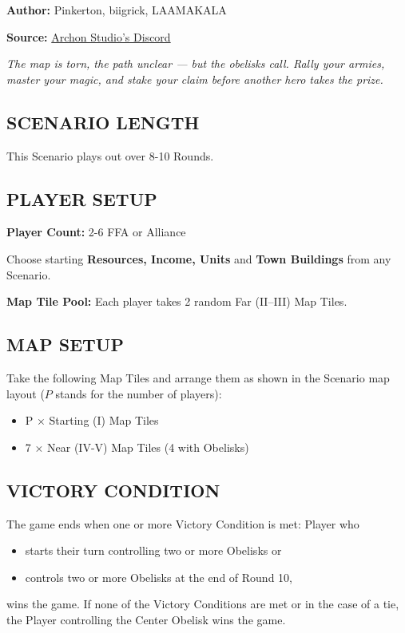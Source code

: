 
\begin{multicols*}{2}

\textbf{Author:} Pinkerton, biigrick, LAAMAKALA

\textbf{Source:} \href{<https://discord.com/channels/740870068178649108/1232319328049954826>}{Archon Studio's Discord}

\textit{The map is torn, the path unclear — but the obelisks call. Rally your armies, master your magic, and stake your claim before another hero takes the prize.}  %

\subsection*{\MakeUppercase{Scenario Length}}
This Scenario plays out over 8-10 Rounds.

\subsection*{\MakeUppercase{Player Setup}}
\textbf{Player Count:} 2-6 FFA or Alliance

Choose starting \textbf{Resources, Income, Units} and \textbf{Town Buildings} from any Scenario.

\textbf{Map Tile Pool:} Each player takes 2 random Far (II--III) Map Tiles.

\subsection*{\MakeUppercase{Map Setup}}
Take the following Map Tiles and arrange them as shown in the Scenario map layout ($P$ stands for the number of players):

\begin{itemize}
  \item P × Starting (I) Map Tiles
  \item 7 × Near (IV-V) Map Tiles (4 with Obelisks)
\end{itemize}

\subsection*{\MakeUppercase{Victory Condition}}
The game ends when one or more Victory Condition is met: Player who
\begin{itemize}
  \item starts their turn controlling two or more Obelisks or
  \item controls two or more Obelisks at the end of Round 10,
\end{itemize}
wins the game. If none of the Victory Conditions are met or in the case of a tie, the Player controlling the Center Obelisk wins the game.


\end{multicols*}
